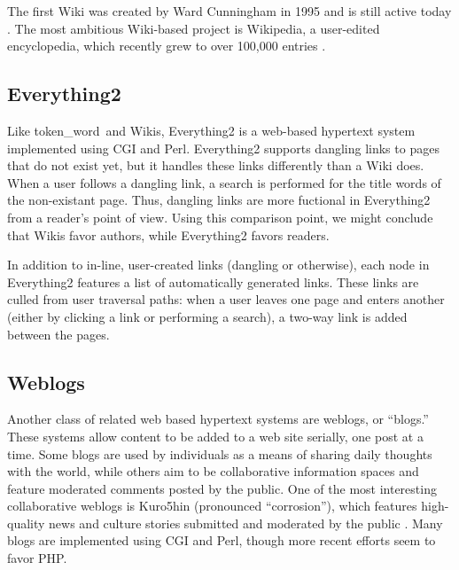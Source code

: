 \documentclass{acm_proc_article-sp}
\newcommand{\tw}{token\_word}
\begin{document}


The first Wiki was created by Ward Cunningham in 1995 and is still active today \cite{WikiWikiWeb}.
The most ambitious Wiki-based project is Wikipedia, a user-edited encyclopedia, which recently grew to over 100,000 entries \cite{Wikipedia}.


\subsection{Everything2}
Like \tw \  and Wikis, Everything2 \cite{Everything2} is a web-based hypertext system implemented using CGI and Perl.
Everything2 supports dangling links to pages that do not exist yet, but it handles these links differently than a Wiki does.
When a user follows a dangling link, a search is performed for the title words of the non-existant page.
Thus, dangling links are more fuctional in Everything2 from a reader's point of view.
Using this comparison point, we might conclude that Wikis favor authors, while Everything2 favors readers.

In addition to in-line, user-created links (dangling or otherwise), each node in Everything2 features a list of automatically generated links.
These links are culled from user traversal paths:  when a user leaves one page and enters another (either by clicking a link or performing a search), a two-way link is added between the pages.   


\subsection{Weblogs}
Another class of related web based hypertext systems are weblogs, or ``blogs.''
These systems allow content to be added to a web site serially, one post at a time.
Some blogs are used by individuals as a means of sharing daily thoughts with the world, while others aim to be collaborative information spaces and feature moderated comments posted by the public.
One of the most interesting collaborative weblogs is Kuro5hin (pronounced ``corrosion''), which features high-quality news and culture stories submitted and moderated by the public \cite{kuro5hin}.
Many blogs are implemented using CGI and Perl, though more recent efforts seem to favor PHP.
\end{document}
